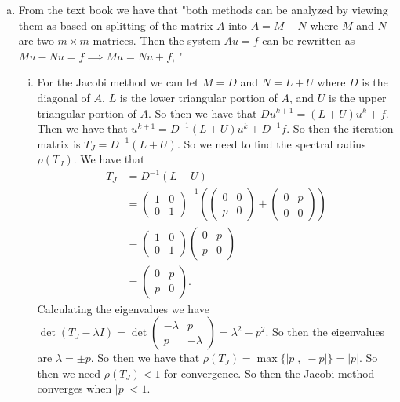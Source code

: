 \documentclass{article}
\begin{document}
\begin{enumerate}[(a)]
    \item From the text book we have that "both methods can be analyzed by viewing them as based on splitting of the matrix $A$ into $A = M - N$ where $M$ and $N$ are two $m \times m$ matrices. Then the system $Au = f$ can be rewritten as $Mu - Nu = f \implies Mu = Nu + f$, "
    \begin{enumerate}[i.)]
        \item For the Jacobi method we can let $M = D$ and $N = L + U$ where $D$ is the diagonal of $A$, $L$ is the lower triangular portion of $A$, and $U$ is the upper triangular portion of $A$. So then we have that $Du^{k+1} = (L + U)u^k + f$. Then we have that $u^{k+1} = D^{-1}(L + U)u^k + D^{-1}f$. So then the iteration matrix is $T_J = D^{-1}(L + U)$. So we need to find the spectral radius $\rho(T_J)$. We have that
        \begin{align*}
            T_J &= D^{-1}(L + U) \\
            &= \begin{pmatrix}
                1 & 0 \\
                0 & 1
            \end{pmatrix}^{-1} \left( \begin{pmatrix}
                0 & 0 \\
                p & 0
            \end{pmatrix} + \begin{pmatrix}
                0 & p \\
                0 & 0
            \end{pmatrix} \right) \\
            &= \begin{pmatrix}
                1 & 0 \\
                0 & 1
            \end{pmatrix} \begin{pmatrix}
                0 & p \\
                p & 0
            \end{pmatrix} \\
            &= \begin{pmatrix}
                0 & p \\
                p & 0
            \end{pmatrix}.
        \end{align*}
        Calculating the eigenvalues we have $\det(T_J - \lambda I) = \det \begin{pmatrix}
            -\lambda & p \\
            p & -\lambda
        \end{pmatrix} = \lambda^2 - p^2$. So then the eigenvalues are $\lambda = \pm p$. So then we have that $\rho(T_J) = \max\{\vert p \vert, \vert -p \vert\} = \vert p \vert$. So then we need $\rho(T_J) < 1$ for convergence. So then the Jacobi method converges when $\vert p \vert < 1$.
          


\end{enumerate}
\end{enumerate}
\end{document}

